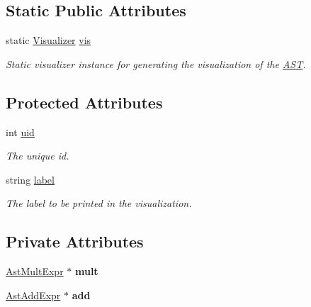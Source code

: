 \subsection*{Static Public Attributes}
\begin{DoxyCompactItemize}
\item 
\hypertarget{classAST_aca9e6637209b31e03a09c0d42f29bdfa}{static \hyperlink{classVisualizer}{Visualizer} \hyperlink{classAST_aca9e6637209b31e03a09c0d42f29bdfa}{vis}}\label{classAST_aca9e6637209b31e03a09c0d42f29bdfa}

\begin{DoxyCompactList}\small\item\em Static visualizer instance for generating the visualization of the \hyperlink{classAST}{A\-S\-T}. \end{DoxyCompactList}\end{DoxyCompactItemize}
\subsection*{Protected Attributes}
\begin{DoxyCompactItemize}
\item 
\hypertarget{classAST_a847b778f1c3dd5a19de32de432ee6e15}{int \hyperlink{classAST_a847b778f1c3dd5a19de32de432ee6e15}{uid}}\label{classAST_a847b778f1c3dd5a19de32de432ee6e15}

\begin{DoxyCompactList}\small\item\em The unique id. \end{DoxyCompactList}\item 
\hypertarget{classAST_ab2e239ccc0688d2341724432ff5a1a31}{string \hyperlink{classAST_ab2e239ccc0688d2341724432ff5a1a31}{label}}\label{classAST_ab2e239ccc0688d2341724432ff5a1a31}

\begin{DoxyCompactList}\small\item\em The label to be printed in the visualization. \end{DoxyCompactList}\end{DoxyCompactItemize}
\subsection*{Private Attributes}
\begin{DoxyCompactItemize}
\item 
\hypertarget{classAstAddExpr_ae8862b7ba3b4e5b02ce5bb233febf80b}{\hyperlink{classAstMultExpr}{Ast\-Mult\-Expr} $\ast$ {\bfseries mult}}\label{classAstAddExpr_ae8862b7ba3b4e5b02ce5bb233febf80b}

\item 
\hypertarget{classAstAddExpr_aef835a22fbe1c65c52726419cdf6757a}{\hyperlink{classAstAddExpr}{Ast\-Add\-Expr} $\ast$ {\bfseries add}}\label{classAstAddExpr_aef835a22fbe1c65c52726419cdf6757a}

\end{DoxyCompactItemize}


